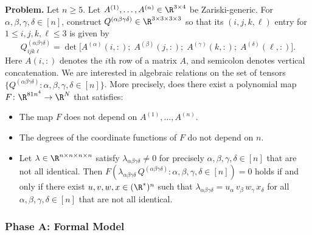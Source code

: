 
\textbf{Problem.}
Let $n \geq 5$. Let $A^{(1)}, \ldots, A^{(n)} \in \R^{3 \times 4}$ be Zariski-generic. For
$\alpha, \beta, \gamma, \delta \in [n]$, construct $Q^{(\alpha\beta\gamma\delta)} \in \R^{3 \times 3 \times 3 \times 3}$
so that its $(i,j,k,\ell)$ entry for $1 \leq i,j,k,\ell \leq 3$ is given by
\[
  Q^{(\alpha\beta\gamma\delta)}_{ijk\ell}
  = \det\!\bigl[A^{(\alpha)}(i,:);\; A^{(\beta)}(j,:);\; A^{(\gamma)}(k,:);\; A^{(\delta)}(\ell,:)\bigr].
\]
Here $A(i,:)$ denotes the $i$th row of a matrix $A$, and semicolon denotes vertical concatenation.
We are interested in algebraic relations on the set of tensors
$\{Q^{(\alpha\beta\gamma\delta)} : \alpha,\beta,\gamma,\delta \in [n]\}$.
More precisely, does there exist a polynomial map $F \colon \R^{81 n^4} \to \R^N$ that satisfies:
\begin{itemize}
  \item The map $F$ does not depend on $A^{(1)}, \ldots, A^{(n)}$.
  \item The degrees of the coordinate functions of $F$ do not depend on $n$.
  \item Let $\lambda \in \R^{n \times n \times n \times n}$ satisfy $\lambda_{\alpha\beta\gamma\delta} \neq 0$
        for precisely $\alpha,\beta,\gamma,\delta \in [n]$ that are not all identical.
        Then $F(\lambda_{\alpha\beta\gamma\delta}\, Q^{(\alpha\beta\gamma\delta)} : \alpha,\beta,\gamma,\delta \in [n]) = 0$
        holds if and only if there exist $u, v, w, x \in (\R^*)^n$ such that
        $\lambda_{\alpha\beta\gamma\delta} = u_\alpha\, v_\beta\, w_\gamma\, x_\delta$
        for all $\alpha,\beta,\gamma,\delta \in [n]$ that are not all identical.
\end{itemize}


\subsubsection*{Phase A: Formal Model}

